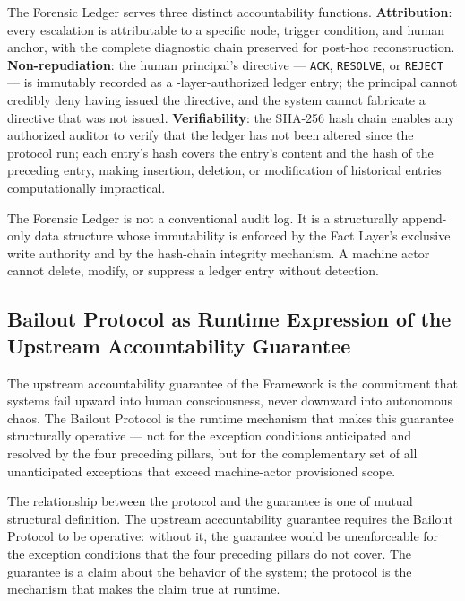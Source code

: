 The Forensic Ledger serves three distinct accountability functions. \textbf{Attribution}: every escalation is attributable to a specific node, trigger condition, and human anchor, with the complete diagnostic chain preserved for post-hoc reconstruction. \textbf{Non-repudiation}: the human principal's directive — \texttt{ACK}, \texttt{RESOLVE}, or \texttt{REJECT} — is immutably recorded as a \purpose-layer-authorized ledger entry; the principal cannot credibly deny having issued the directive, and the system cannot fabricate a directive that was not issued. \textbf{Verifiability}: the SHA-256 hash chain enables any authorized auditor to verify that the ledger has not been altered since the protocol run; each entry's hash covers the entry's content and the hash of the preceding entry, making insertion, deletion, or modification of historical entries computationally impractical.

The Forensic Ledger is not a conventional audit log. It is a structurally append-only data structure whose immutability is enforced by the Fact Layer's exclusive write authority and by the hash-chain integrity mechanism. A machine actor cannot delete, modify, or suppress a ledger entry without detection.

\subsection{Bailout Protocol as Runtime Expression of the Upstream Accountability Guarantee}\label{sec:runtime-expression}

The upstream accountability guarantee of the \bxthree{} Framework is the commitment that \bxthree{} systems fail upward into human consciousness, never downward into autonomous chaos. The Bailout Protocol is the runtime mechanism that makes this guarantee structurally operative — not for the exception conditions anticipated and resolved by the four preceding pillars, but for the complementary set of all unanticipated exceptions that exceed machine-actor provisioned scope.

The relationship between the protocol and the guarantee is one of mutual structural definition. The upstream accountability guarantee requires the Bailout Protocol to be operative: without it, the guarantee would be unenforceable for the exception conditions that the four preceding pillars do not cover. The guarantee is a claim about the behavior of the system; the protocol is the mechanism that makes the claim true at runtime.

